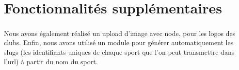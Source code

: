 \documentclass{report}
\begin{document}
%
\chapter{Fonctionnalités supplémentaires}
\thispagestyle{fancy}
	\paragraph{}{
		Nous avons également réalisé un upload d’image avec node, pour les logos des clubs. Enfin, nous avons utilisé un module pour générer automatiquement les slugs (les identifiants uniques de chaque sport que l’on peut transmettre dans l’url) à partir du nom du sport.
	}
\end{document}
